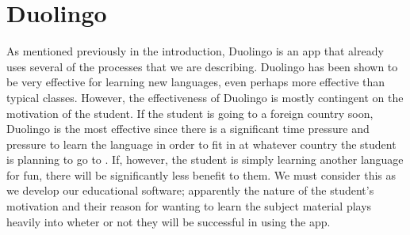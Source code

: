 \section{Duolingo}
As mentioned previously in the introduction, Duolingo is an app that already uses several of the processes that we are describing. Duolingo has been shown to be very effective for learning new languages, even perhaps more effective than typical classes. However, the effectiveness of Duolingo is mostly contingent on the motivation of the student. If the student is going to a foreign country soon, Duolingo is the most effective since there is a significant time pressure and pressure to learn the language in order to fit in at whatever country the student is planning to go to \cite{vesselinov2012duolingo}. If, however, the student is simply learning another language for fun, there will be significantly less benefit to them. We must consider this as we develop our educational software; apparently the nature of the student's motivation and their reason for wanting to learn the subject material plays heavily into wheter or not they will be successful in using the app.